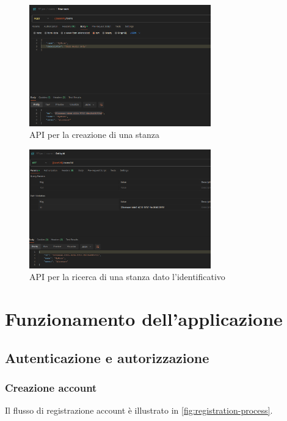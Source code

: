 \documentclass{article}
\begin{document}
\begin{figure}[h]
  \centering
  \includegraphics[width=0.7\textwidth]{figures/create_room.png}
  \caption{API per la creazione di una stanza}
  \label{fig:create-room}
\end{figure}

\begin{figure}[hh]
  \centering
  \includegraphics[width=0.7\textwidth]{figures/get_room.png}
  \caption{API per la ricerca di una stanza dato l'identificativo}
  \label{fig:get-room}
\end{figure}

\clearpage

\section{Funzionamento dell'applicazione}
\subsection{Autenticazione e autorizzazione}
\subsubsection{Creazione account}
Il flusso di registrazione account è illustrato in \cref{fig:registration-process}.
\end{document}
